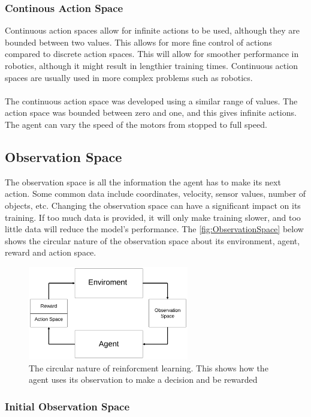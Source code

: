 \documentclass[a4paper,12pt]{article}
\begin{document}
\subsubsection{Continous Action Space}
Continuous action spaces allow for infinite actions to be used, although they are bounded between two values. This allows for more fine control of actions compared to discrete action spaces. This will allow for smoother performance in robotics, although it might result in lengthier training times. Continuous action spaces are usually used in more complex problems such as robotics. 
\\\\
The continuous action space was developed using a similar range of values. The action space was bounded between zero and one, and this gives infinite actions. The agent can vary the speed of the motors from stopped to full speed. 

\subsection{Observation Space}
The observation space is all the information the agent has to make its next action. Some common data include coordinates, velocity, sensor values, number of objects, etc. Changing the observation space can have a significant impact on its training. If too much data is provided, it will only make training slower, and too little data will reduce the model's performance. The \autoref{fig:ObservationSpace} below shows the circular nature of the observation space about its environment, agent, reward and action space.

\begin{figure}[H]
\centering
\includegraphics[width=7cm]{imgs/ObservationSpace.png}
\caption{The circular nature of reinforcment learning. This shows how the agent uses its observation to make a decision and be rewarded}
\label{fig:ObservationSpace}
\end{figure}

 

\subsubsection{Initial Observation Space}
\end{document}
